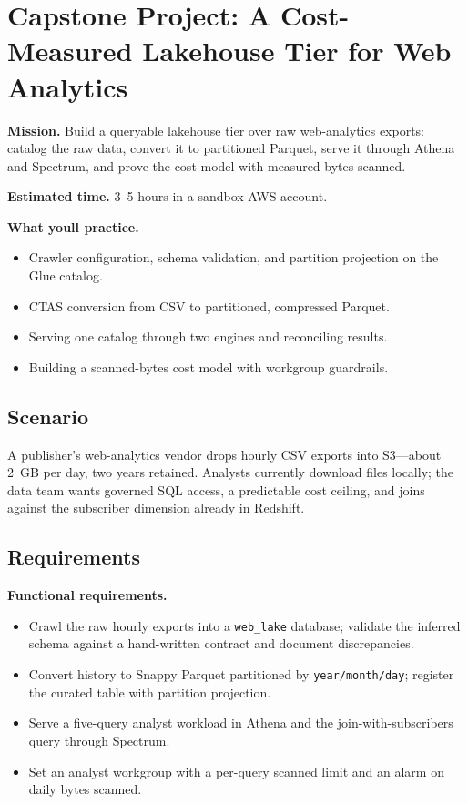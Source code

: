 \section{Capstone Project: A Cost-Measured Lakehouse Tier for Web Analytics}\label{sec:ch7-capstone}

\begin{capstonebox}
\textbf{Mission.} Build a queryable lakehouse tier over raw web-analytics exports: catalog the raw data, convert it to partitioned Parquet, serve it through Athena and Spectrum, and prove the cost model with measured bytes scanned.

\textbf{Estimated time.} 3--5 hours in a sandbox AWS account.

\textbf{What you\textquotesingle{}ll practice.}
\begin{itemize}
    \item Crawler configuration, schema validation, and partition projection on the Glue catalog.
    \item CTAS conversion from CSV to partitioned, compressed Parquet.
    \item Serving one catalog through two engines and reconciling results.
    \item Building a scanned-bytes cost model with workgroup guardrails.
\end{itemize}
\end{capstonebox}

\subsection*{Scenario}
A publisher's web-analytics vendor drops hourly CSV exports into S3---about 2~GB per day, two years retained. Analysts currently download files locally; the data team wants governed SQL access, a predictable cost ceiling, and joins against the subscriber dimension already in Redshift.

\subsection*{Requirements}
\textbf{Functional requirements.}
\begin{itemize}
    \item Crawl the raw hourly exports into a \texttt{web\_lake} database; validate the inferred schema against a hand-written contract and document discrepancies.
    \item Convert history to Snappy Parquet partitioned by \texttt{year/month/day}; register the curated table with partition projection.
    \item Serve a five-query analyst workload in Athena and the join-with-subscribers query through Spectrum.
    \item Set an analyst workgroup with a per-query scanned limit and an alarm on daily bytes scanned.
\end{itemize}

